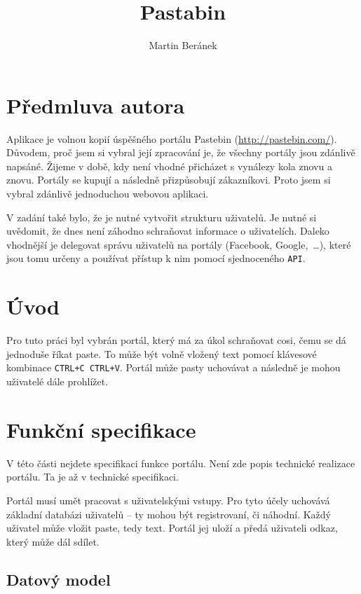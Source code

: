 \documentclass[a4paper,10pt]{report}
\begin{document}
\title{Pastabin}
\author{Martin Beránek}
\maketitle

\tableofcontents
\listoffigures

\chapter{Předmluva autora}

Aplikace je volnou kopií úspěšného portálu Pastebin (\url{http://pastebin.com/}). Důvodem, proč jsem si vybral její zpracování je, že všechny portály jsou zdánlivě napsáné. Žijeme v době, kdy není vhodné přicházet s vynálezy kola znovu a znovu. Portály se kupují a následně přizpůsobují zákazníkovi. Proto jsem si vybral zdánlivě jednoduchou webovou aplikaci.

V zadání také bylo, že je nutné vytvořit strukturu uživatelů. Je nutné si uvědomit, že dnes není záhodno schraňovat informace o uživatelích. Daleko vhodnější je delegovat správu uživatelů na portály (Facebook, Google,~\dots), které jsou tomu určeny a používat přístup k nim pomocí sjednoceného \texttt{API}.

\chapter{Úvod}

Pro tuto práci byl vybrán portál, který má za úkol schraňovat cosi, čemu se dá jednoduše říkat paste. To může být volně vložený text pomocí klávesové kombinace \texttt{CTRL+C CTRL+V}. Portál může pasty uchovávat a následně je mohou uživatelé dále prohlížet.

\chapter{Funkční specifikace}

V této části nejdete specifikaci funkce portálu. Není zde popis technické realizace portálu. Ta je až v technické specifikaci.

Portál musí umět pracovat s uživatelskými vstupy. Pro tyto účely uchovává základní databázi uživatelů -- ty mohou být registrovaní, či náhodní. Každý uživatel může vložit paste, tedy text. Portál jej uloží a předá uživateli odkaz, který může dál sdílet.

\section{Datový model}
\end{document}
